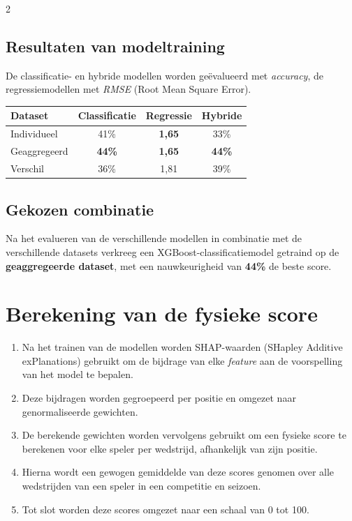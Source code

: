 \documentclass[a0,portrait]{hogent-poster}
\begin{document}
\begin{multicols}{2}
\subsection{Resultaten van modeltraining}
De classificatie- en hybride modellen worden geëvalueerd met \emph{accuracy}, de regressiemodellen met \emph{RMSE} (Root Mean Square Error).
\begin{center}
  \begin{tabular}{lccc}
  \toprule
  Dataset & Classificatie & Regressie & Hybride \\
  \midrule
  Individueel   & 41\% & \textbf{1,65} & 33\% \\
  Geaggregeerd  & \textbf{44\%} & \textbf{1,65} & \textbf{44\%} \\
  Verschil      & 36\% & 1,81 & 39\% \\
  \bottomrule
  \end{tabular}
\end{center}


\subsection{Gekozen combinatie}
Na het evalueren van de verschillende modellen in combinatie met de verschillende datasets verkreeg een XGBoost-classificatiemodel getraind op de \textbf{geaggregeerde dataset}, met een nauwkeurigheid van \textbf{44\%} de beste score.
\section{Berekening van de fysieke score}
\begin{enumerate}
  \item Na het trainen van de modellen worden SHAP-waarden (SHapley Additive exPlanations) gebruikt om de bijdrage van elke \emph{feature} aan de voorspelling van het model te bepalen.
  \item Deze bijdragen worden gegroepeerd per positie en omgezet naar genormaliseerde gewichten.
  \item De berekende gewichten worden vervolgens gebruikt om een fysieke score te berekenen voor elke speler per wedstrijd, afhankelijk van zijn positie.
  \item Hierna wordt een gewogen gemiddelde van deze scores genomen over alle wedstrijden van een speler in een competitie en seizoen.
  \item Tot slot worden deze scores omgezet naar een schaal van 0 tot 100.
\end{enumerate}

\end{multicols}
\end{document}
